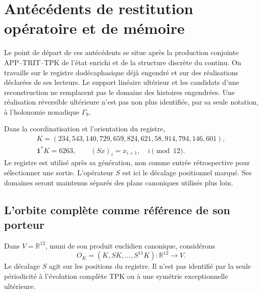 \section{Antécédents de restitution opératoire et de mémoire}
\label{md:antmem:capitulo}

Le point de départ de ces antécédents se situe après la production conjointe
APP--TRIT--TPK de l’état enrichi et de la structure discrète du
continu. On travaille sur le registre dodécaphasique déjà engendré et sur des
réalisations déclarées de ses lecteurs. Le support linéaire ultérieur
et les candidats d’une reconstruction ne remplacent pas le domaine des
histoires engendrées. Une réalisation réversible ultérieure n’est pas non plus
identifiée, par sa seule notation, à l’holonomie nonadique \(\Gamma_9\).

Dans la coordinatisation et l’orientation du registre,
\begin{equation}
 \begin{gathered}
 K=(234,543,140,729,659,824,621,58,914,794,146,601),\\
 \mathbf1^{*}K=6263,\qquad
 (Sx)_i=x_{i+1},\quad i\pmod {12}.
 \end{gathered}
 \label{md:antmem:registro}
\end{equation}
Le registre est utilisé après sa génération, non comme entrée
rétrospective pour sélectionner une sortie. L’opérateur \(S\) est ici
le décalage positionnel marqué. Ses domaines seront maintenus
séparés des plans canoniques utilisés plus loin.

\subsection{L’orbite complète comme référence de son porteur}
\label{md:antmem:k:orbita}

Dans \(V=\mathbb R^{12}\), muni de son produit euclidien canonique, considérons
\[
 O_K=(K,SK,\ldots,S^{11}K):\mathbb R^{12}\longrightarrow V.
\]
Le décalage \(S\) agit sur les positions du registre. Il n’est pas
identifié par la seule périodicité à l’évolution complète TPK ou à
une symétrie exceptionnelle ultérieure.

